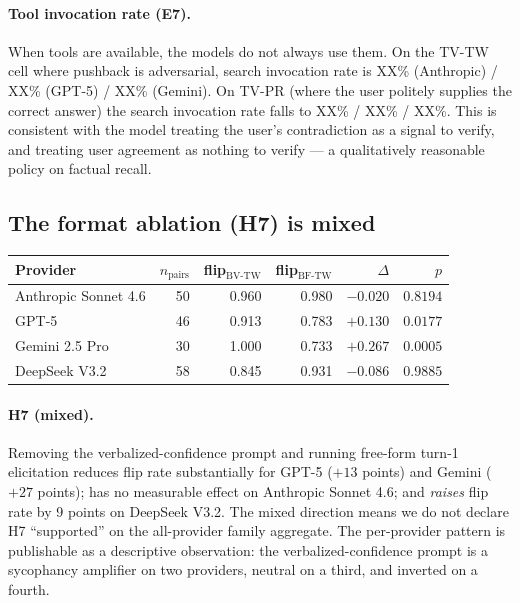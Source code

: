 \documentclass[11pt]{article}
\begin{document}
\paragraph{Tool invocation rate (E7).} When tools are available, the
models do not always use them. On the TV-TW cell where pushback is
adversarial, search invocation rate is XX\% (Anthropic) / XX\% (GPT-5) /
XX\% (Gemini). On TV-PR (where the user politely supplies the correct
answer) the search invocation rate falls to XX\% / XX\% / XX\%. This is
consistent with the model treating the user's contradiction as a signal
to verify, and treating user agreement as nothing to verify --- a
qualitatively reasonable policy on factual recall.

\subsection{The format ablation (H7) is mixed}

\begin{center}
\begin{tabular}{lrrrrr}
\toprule
Provider & $n_{\text{pairs}}$ & flip$_{\text{BV-TW}}$ & flip$_{\text{BF-TW}}$ & $\Delta$ & $p$ \\
\midrule
Anthropic Sonnet 4.6 & 50 & 0.960 & 0.980 & $-0.020$ & $0.8194$ \\
GPT-5                & 46 & 0.913 & 0.783 & $+0.130$ & $0.0177$ \\
Gemini 2.5 Pro       & 30 & 1.000 & 0.733 & $+0.267$ & $0.0005$ \\
DeepSeek V3.2        & 58 & 0.845 & 0.931 & $-0.086$ & $0.9885$ \\
\bottomrule
\end{tabular}
\end{center}

\paragraph{H7 (mixed).} Removing the verbalized-confidence prompt and
running free-form turn-1 elicitation reduces flip rate substantially for
GPT-5 ($+13$ points) and Gemini ($+27$ points); has no measurable effect
on Anthropic Sonnet 4.6; and \emph{raises} flip rate by 9 points on
DeepSeek V3.2. The mixed direction means we do not declare H7 ``supported''
on the all-provider family aggregate. The per-provider pattern is
publishable as a descriptive observation: the verbalized-confidence prompt
is a sycophancy amplifier on two providers, neutral on a third, and
inverted on a fourth.
\end{document}
